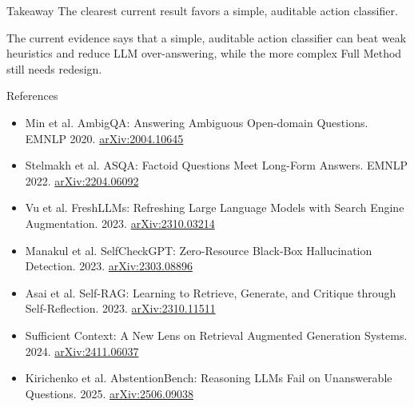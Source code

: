 \documentclass[aspectratio=169,10pt]{beamer}
\begin{document}
\begin{frame}{Takeaway}
  \Large
  The clearest current result favors a simple, auditable action classifier.
  \vspace{6mm}

  \normalsize
  The current evidence says that a simple, auditable action classifier can beat weak heuristics and reduce LLM over-answering, while the more complex Full Method still needs redesign.
\end{frame}

\begin{frame}{References}
  \footnotesize
  \begin{itemize}
    \item Min et al. AmbigQA: Answering Ambiguous Open-domain Questions. EMNLP 2020. \href{https://arxiv.org/abs/2004.10645}{arXiv:2004.10645}
    \item Stelmakh et al. ASQA: Factoid Questions Meet Long-Form Answers. EMNLP 2022. \href{https://arxiv.org/abs/2204.06092}{arXiv:2204.06092}
    \item Vu et al. FreshLLMs: Refreshing Large Language Models with Search Engine Augmentation. 2023. \href{https://arxiv.org/abs/2310.03214}{arXiv:2310.03214}
    \item Manakul et al. SelfCheckGPT: Zero-Resource Black-Box Hallucination Detection. 2023. \href{https://arxiv.org/abs/2303.08896}{arXiv:2303.08896}
    \item Asai et al. Self-RAG: Learning to Retrieve, Generate, and Critique through Self-Reflection. 2023. \href{https://arxiv.org/abs/2310.11511}{arXiv:2310.11511}
    \item Sufficient Context: A New Lens on Retrieval Augmented Generation Systems. 2024. \href{https://arxiv.org/abs/2411.06037}{arXiv:2411.06037}
    \item Kirichenko et al. AbstentionBench: Reasoning LLMs Fail on Unanswerable Questions. 2025. \href{https://arxiv.org/abs/2506.09038}{arXiv:2506.09038}
  \end{itemize}
\end{frame}
\end{document}
